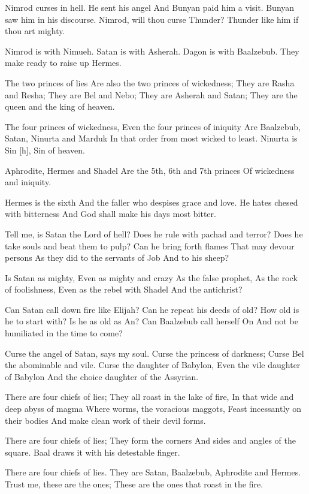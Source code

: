 \documentclass[
]{book}
\begin{document}
Nimrod curses in hell.
He sent his angel
And Bunyan paid him a visit.
Bunyan saw him in his discourse.
Nimrod, will thou curse Thunder?
Thunder like him if thou art mighty.

Nimrod is with Nimueh.
Satan is with Asherah.
Dagon is with Baalzebub.
They make ready to raise up Hermes.

The two princes of lies
Are also the two princes of wickedness;
They are Rasha and Resha;
They are Bel and Nebo;
They are Asherah and Satan;
They are the queen and the king of heaven.

The four princes of wickedness,
Even the four princes of iniquity
Are Baalzebub, Satan, Ninurta and Marduk
In that order from most wicked to least.
Ninurta is Sin {[}h{]}, Sin of heaven.

Aphrodite, Hermes and Shadel
Are the 5th, 6th and 7th princes
Of wickedness and iniquity.

Hermes is the sixth
And the faller who despises grace and love.
He hates chesed with bitterness
And God shall make his days most bitter.

Tell me, is Satan the Lord of hell?
Does he rule with pachad and terror?
Does he take souls and beat them to pulp?
Can he bring forth flames
That may devour persons
As they did to the servants of Job
And to his sheep?

Is Satan as mighty,
Even as mighty and crazy
As the false prophet,
As the rock of foolishness,
Even as the rebel with Shadel
And the antichrist?

Can Satan call down fire like Elijah?
Can he repeat his deeds of old?
How old is he to start with?
Is he as old as An?
Can Baalzebub call herself On
And not be humiliated in the time to come?

Curse the angel of Satan, says my soul.
Curse the princess of darkness;
Curse Bel the abominable and vile.
Curse the daughter of Babylon,
Even the vile daughter of Babylon
And the choice daughter of the Assyrian.

There are four chiefs of lies;
They all roast in the lake of fire,
In that wide and deep abyss of magma
Where worms, the voracious maggots,
Feast incessantly on their bodies
And make clean work of their devil forms.

There are four chiefs of lies;
They form the corners
And sides and angles of the square.
Baal draws it with his detestable finger.

There are four chiefs of lies.
They are Satan, Baalzebub,
Aphrodite and Hermes.
Trust me, these are the ones;
These are the ones that roast in the fire.
\end{document}
